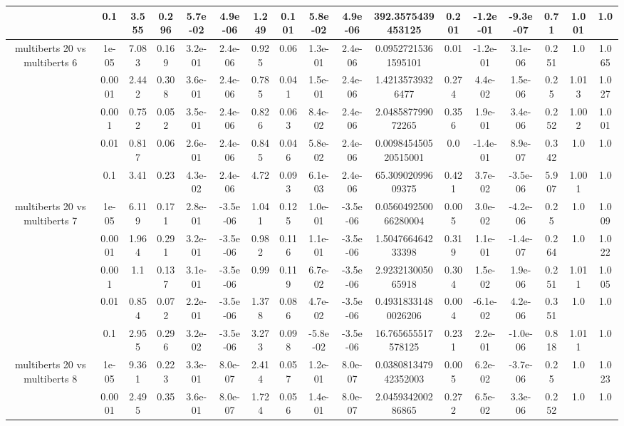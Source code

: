 \begin{tabular}{|c|c|c|c|c|c|c|c|c|c|c|c|c|c|c|c|c|}
 & 0.1 & 3.555 & 0.296 & 5.7e-02 & 4.9e-06 & 1.249 & 0.101 & 5.8e-02 & 4.9e-06 & 392.3575439453125 & 0.201 & -1.2e-01 & -9.3e-07 & 0.71 & 1.001 & 1.0 \\
\hline
\multirow{5}{*}{multiberts 20 vs multiberts 6} & 1e-05 & 7.083 & 0.169 & 3.2e-01 & 2.4e-06 & 0.925 & 0.06 & 1.3e-01 & 2.4e-06 & 0.09527215361595101 & 0.01 & -1.2e-01 & 3.1e-06 & 0.251 & 1.0 & 1.065 \\
 & 0.0001 & 2.442 & 0.308 & 3.6e-01 & 2.4e-06 & 0.785 & 0.041 & 1.5e-01 & 2.4e-06 & 1.42135739326477 & 0.274 & 4.4e-02 & 1.5e-06 & 0.25 & 1.013 & 1.027 \\
 & 0.001 & 0.752 & 0.052 & 3.5e-01 & 2.4e-06 & 0.826 & 0.063 & 8.4e-02 & 2.4e-06 & 2.048587799072265 & 0.356 & 1.9e-01 & 3.4e-06 & 0.252 & 1.002 & 1.001 \\
 & 0.01 & 0.817 & 0.06 & 2.6e-01 & 2.4e-06 & 0.845 & 0.046 & 5.8e-02 & 2.4e-06 & 0.009845450520515001 & 0.0 & -1.4e-01 & 8.9e-07 & 0.342 & 1.0 & 1.0 \\
 & 0.1 & 3.41 & 0.23 & 4.3e-02 & 2.4e-06 & 4.72 & 0.093 & 6.1e-03 & 2.4e-06 & 65.30902099609375 & 0.421 & 3.7e-02 & -3.5e-06 & 5.907 & 1.001 & 1.0 \\
\hline
\multirow{5}{*}{multiberts 20 vs multiberts 7} & 1e-05 & 6.119 & 0.171 & 2.8e-01 & -3.5e-06 & 1.041 & 0.125 & 1.0e-01 & -3.5e-06 & 0.056049250066280004 & 0.005 & 3.0e-02 & -4.2e-06 & 0.25 & 1.0 & 1.009 \\
 & 0.0001 & 1.964 & 0.291 & 3.2e-01 & -3.5e-06 & 0.982 & 0.116 & 1.1e-01 & -3.5e-06 & 1.504766464233398 & 0.319 & 1.1e-01 & -1.4e-07 & 0.264 & 1.0 & 1.022 \\
 & 0.001 & 1.1 & 0.137 & 3.1e-01 & -3.5e-06 & 0.99 & 0.119 & 6.7e-02 & -3.5e-06 & 2.923213005065918 & 0.304 & 1.5e-02 & 1.9e-06 & 0.251 & 1.011 & 1.005 \\
 & 0.01 & 0.854 & 0.072 & 2.2e-01 & -3.5e-06 & 1.378 & 0.086 & 4.7e-02 & -3.5e-06 & 0.49318331480026206 & 0.004 & -6.1e-02 & 4.2e-06 & 0.351 & 1.0 & 1.0 \\
 & 0.1 & 2.955 & 0.296 & 3.2e-02 & -3.5e-06 & 3.273 & 0.098 & -5.8e-02 & -3.5e-06 & 16.765655517578125 & 0.231 & 2.2e-01 & -1.0e-06 & 0.818 & 1.011 & 1.0 \\
\hline
\multirow{5}{*}{multiberts 20 vs multiberts 8} & 1e-05 & 9.361 & 0.223 & 3.3e-01 & 8.0e-07 & 2.414 & 0.057 & 1.2e-01 & 8.0e-07 & 0.038081347942352003 & 0.005 & 6.2e-02 & -3.7e-06 & 0.25 & 1.0 & 1.023 \\
 & 0.0001 & 2.495 & 0.35 & 3.6e-01 & 8.0e-07 & 1.724 & 0.056 & 1.4e-01 & 8.0e-07 & 2.045934200286865 & 0.272 & 6.5e-02 & 3.3e-06 & 0.252 & 1.0 & 1.0 \\

\end{tabular}
